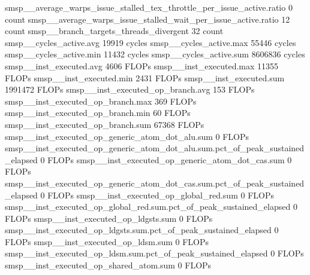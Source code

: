 smsp__average_warps_issue_stalled_tex_throttle_per_issue_active.ratio                          0 count
smsp__average_warps_issue_stalled_wait_per_issue_active.ratio                                 12 count
smsp__branch_targets_threads_divergent                                                        32 count
smsp__cycles_active.avg                                                                    19919 cycles
smsp__cycles_active.max                                                                    55446 cycles
smsp__cycles_active.min                                                                    11432 cycles
smsp__cycles_active.sum                                                                  8606836 cycles
smsp__inst_executed.avg                                                                     4606 FLOPs
smsp__inst_executed.max                                                                    11355 FLOPs
smsp__inst_executed.min                                                                     2431 FLOPs
smsp__inst_executed.sum                                                                  1991472 FLOPs
smsp__inst_executed_op_branch.avg                                                            153 FLOPs
smsp__inst_executed_op_branch.max                                                            369 FLOPs
smsp__inst_executed_op_branch.min                                                             60 FLOPs
smsp__inst_executed_op_branch.sum                                                          67368 FLOPs
smsp__inst_executed_op_generic_atom_dot_alu.sum                                                0 FLOPs
smsp__inst_executed_op_generic_atom_dot_alu.sum.pct_of_peak_sustained_elapsed                  0 FLOPs
smsp__inst_executed_op_generic_atom_dot_cas.sum                                                0 FLOPs
smsp__inst_executed_op_generic_atom_dot_cas.sum.pct_of_peak_sustained_elapsed                  0 FLOPs
smsp__inst_executed_op_global_red.sum                                                          0 FLOPs
smsp__inst_executed_op_global_red.sum.pct_of_peak_sustained_elapsed                            0 FLOPs
smsp__inst_executed_op_ldgsts.sum                                                              0 FLOPs
smsp__inst_executed_op_ldgsts.sum.pct_of_peak_sustained_elapsed                                0 FLOPs
smsp__inst_executed_op_ldsm.sum                                                                0 FLOPs
smsp__inst_executed_op_ldsm.sum.pct_of_peak_sustained_elapsed                                  0 FLOPs
smsp__inst_executed_op_shared_atom.sum                                                         0 FLOPs
